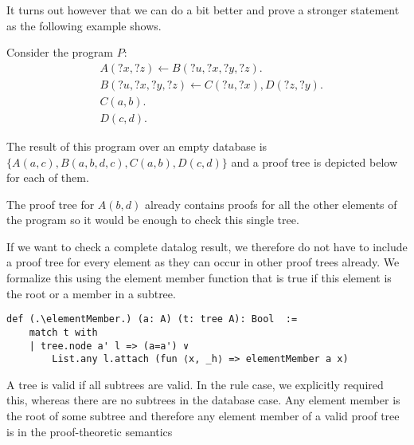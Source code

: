 It turns out however that we can do a bit better and prove a stronger statement as the following example shows.
\begin{example}
    Consider the program $P:$
    \begin{align*}
        & A(?x, ?z) \leftarrow B(?u,?x, ?y, ?z). \\
        & B(?u,?x, ?y, ?z) \leftarrow C(?u,?x), D(?z, ?y). \\
        & C(a,b). \\
        & D(c,d).
        \end{align*}

    The result of this program over an empty database is $\{A(a,c), B(a,b,d,c), C(a,b), D(c,d)\}$ and a proof tree is depicted below for each of them.
    \\



    The proof tree for $A(b,d)$ already contains proofs for all the other elements of the program so it would be enough to check this single tree.
\end{example}

If we want to check a complete datalog result, we therefore do not have to include a proof tree for every element as they can occur in other proof trees already. We formalize this using the element member function that is true if this element is the root or a member in a subtree.

\begin{lstlisting}
def (.\elementMember.) (a: A) (t: tree A): Bool  :=
    match t with
    | tree.node a' l => (a=a') ∨
        List.any l.attach (fun ⟨x, _h⟩ => elementMember a x)
\end{lstlisting}

A tree is valid if all subtrees are valid. In the rule case, we explicitly required this, whereas there are no subtrees in the database case. Any element member is the root of some subtree and therefore any element member of a valid proof tree is in the proof-theoretic semantics 


